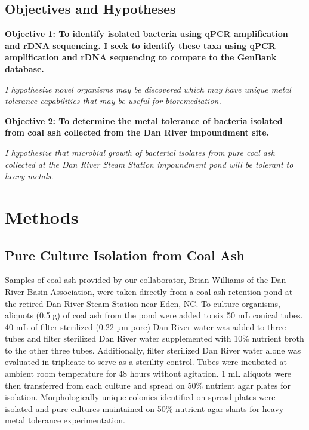 \documentclass[ms, hidelinks]{uncgdissertationexp}
\theoremstyle{plain}
\theoremstyle{definition}
\theoremstyle{remark}
\begin{document}
\hypertarget{objectives-and-hypotheses}{%
\subsection{Objectives and Hypotheses}\label{objectives-and-hypotheses}}

\textbf{Objective 1: To identify isolated bacteria using qPCR amplification and rDNA sequencing. I seek to identify these taxa using qPCR amplification and rDNA sequencing to compare to the GenBank database.}

\emph{I hypothesize novel organisms may be discovered which may have unique metal tolerance capabilities that may be useful for bioremediation.}

\textbf{Objective 2: To determine the metal tolerance of bacteria isolated from coal ash collected from the Dan River impoundment site.}

\emph{I hypothesize that microbial growth of bacterial isolates from pure coal ash collected at the Dan River Steam Station impoundment pond will be tolerant to heavy metals.}

\hypertarget{methods-1}{%
\section{Methods}\label{methods-1}}

\hypertarget{pure-culture-isolation-from-coal-ash}{%
\subsection{Pure Culture Isolation from Coal Ash}\label{pure-culture-isolation-from-coal-ash}}

Samples of coal ash provided by our collaborator, Brian Williams of the Dan River Basin Association, were taken directly from a coal ash retention pond at the retired Dan River Steam Station near Eden, NC. To culture organisms, aliquots (0.5 g) of coal ash from the pond were added to six 50 mL conical tubes. 40 mL of filter sterilized (0.22 µm pore) Dan River water was added to three tubes and filter sterilized Dan River water supplemented with 10\% nutrient broth to the other three tubes. Additionally, filter sterilized Dan River water alone was evaluated in triplicate to serve as a sterility control. Tubes were incubated at ambient room temperature for 48 hours without agitation. 1 mL aliquots were then transferred from each culture and spread on 50\% nutrient agar plates for isolation. Morphologically unique colonies identified on spread plates were isolated and pure cultures maintained on 50\% nutrient agar slants for heavy metal tolerance experimentation. 
\end{document}
